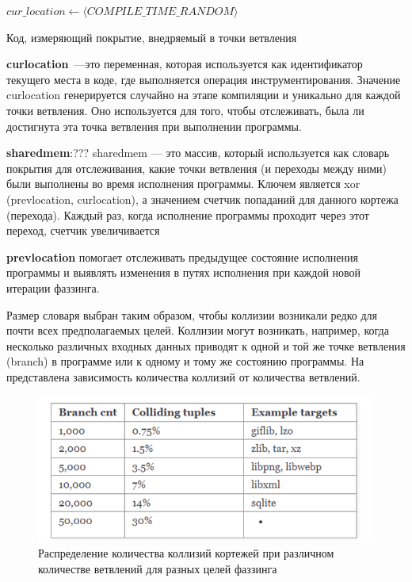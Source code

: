 \begin{algorithm}
	\SetAlgoLined 
	\DontPrintSemicolon 
	
	\BlankLine
	$cur\_location \gets \langle COMPILE\_TIME\_RANDOM \rangle$\;
	\BlankLine
	\caption{Код, измеряющий покрытие, внедряемый в точки ветвления~\cite{???}}
	\label{alg:AlgoFDSCALING}
\end{algorithm}

\textbf{cur\textunderscore location}~---это переменная, которая используется как идентификатор текущего места в коде, где выполняется операция инструментирования. Значение cur\textunderscore location генерируется случайно на этапе компиляции и уникально для каждой точки ветвления. Оно используется для того, чтобы отслеживать, была ли достигнута эта точка ветвления при выполнении программы.

\textbf{shared\textunderscore mem}:???
shared\textunderscore mem — это массив, который используется как словарь покрытия для отслеживания, какие точки ветвления (и переходы между ними) были выполнены во время исполнения программы. Ключем является xor (prev\textunderscore location, cur\textunderscore location), а значением счетчик попаданий для данного кортежа (перехода). Каждый раз, когда исполнение программы проходит через этот переход, счетчик увеличивается

\textbf{prev\textunderscore location}
помогает отслеживать предыдущее состояние исполнения программы и выявлять изменения в путях исполнения при каждой новой итерации фаззинга.

\par
Размер словаря выбран таким образом, чтобы коллизии возникали редко для почти всех предполагаемых целей. Коллизии могут возникать, например, когда несколько различных входных данных приводят к одной и той же точке ветвления (branch) в программе или к одному и тому же состоянию программы.
На  представлена зависимость количества коллизий от количества ветвлений.

\begin{figure}[ht] 
	\center
	\includegraphics [scale=1] {my_folder/images/coverage_measuring}
	\caption{Распределение количества коллизий кортежей при различном количестве ветвлений для разных целей фаззинга~\cite{???}} 
	\label{fig:coverage-measuring-ch3}  
\end{figure}

